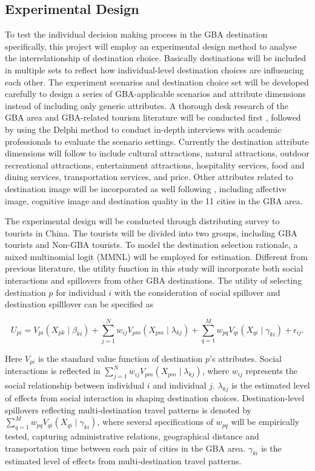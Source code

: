 \documentclass[11pt,a4paper]{amsart}
\theoremstyle{plain}
\theoremstyle{definition}
\begin{document}
\subsection{Experimental Design}\hfill\par 
\noindent To test the individual decision making process in the GBA destination specifically, this project will employ an experimental design method to analyse the interrelationship of destination choice. Basically destinations will be included in multiple sets to reflect how individual-level destination choices are influencing each other. The experiment scenarios and destination choice set will be developed carefully to design a series of GBA-applicable scenarios and attribute dimensions instead of including only generic attributes. A thorough desk research of the GBA area and GBA-related tourism literature will be conducted first , followed by using the Delphi method to conduct in-depth interviews with academic professionals to evaluate the scenario settings. Currently the destination attribute dimensions will follow \textcite{masieroModelingReferenceExperience2018} to include cultural attractions, natural attractions, outdoor recreational attractions, entertainment attractions, hospitality services, food and dining services, transportation services, and price. Other attributes related to destination image will be incorporated as well following \textcite{kirillovaDevelopingCoopetitiveDestination2020}, including affective image, cognitive image and destination quality in the 11 cities in the GBA area. 

\noindent The experimental design will be conducted through distributing survey to tourists in China. The tourists will be divided into two groups, including GBA tourists and Non-GBA tourists. To model the destination selection rationale, a mixed multinomial logit (MMNL) will be employed for estimation. Different from previous literature, the utility function in this study will incorporate both social interactions and spillovers from other GBA destinations. The utility of selecting destination $p$ for individual $i$ with the consideration of social spillover and destination spilllover can be specified as 

\[	U_{pi} = V_{pi}(X_{pk} \mid \beta_{ki}) + \sum_{j = 1}^{N} w_{ij}V_{pm}(X_{pm}\mid \lambda_{kj}) + \sum_{q = 1}^{M}w_{pq}V_{qi}(X_{qi}\mid\gamma_{ki}) + \epsilon_{ij}.	\]

\noindent Here $V_{pi}$ is the standard value function of destination $p$’s attributes. Social interactions is reflected in $ \sum_{j = 1}^{N} w_{ij}V_{pm}(X_{pm}\mid \lambda_{kj})$, where $w_{ij}$ represents the social relationship between individual $i$ and individual $j$. $\lambda_{kj}$ is the estimated level of effects from social interaction in shaping destination choices. Destination-level spillovers reflecting multi-destination travel patterns is denoted by $\sum_{q = 1}^{M}w_{pq}V_{qi}(X_{qi}\mid\gamma_{ki})$, where several specifications of $w_{pq}$ will be empirically tested, capturing administrative relations, geographical distance and transportation time between each pair of cities in the GBA area. $\gamma_{ki}$ is the estimated level of effects from multi-destination travel patterns.
\end{document}
